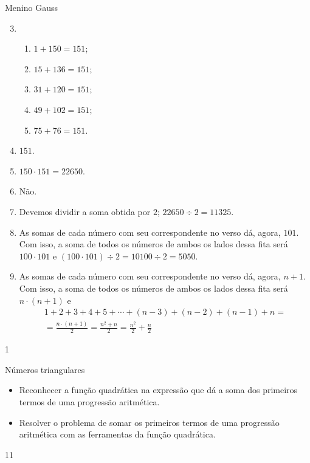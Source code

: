 \begin{answer}{Menino Gauss}
{
\begin{enumerate}\setcounter{enumi}{2}
\item {} 
\begin{enumerate}[label=\Roman*)]
\item \(1+150=151\);

\item \(15+136=151\);

\item \(31+120=151\);

\item \(49+102=151\);

\item \(75+76=151\).
\end{enumerate}

\item {} 
\(151\).

\item {} 
\(150 \cdot 151=22650\).

\item {} 
Não.

\item {} 
Devemos dividir a soma obtida por \(2\); \(22650 \div 2=11325\).

\item {} 
As somas de cada número com seu correspondente no verso dá, agora, \(101\). Com isso, a soma de todos os números de ambos os lados dessa fita será \(100 \cdot 101\) e \((100 \cdot 101) \div 2 = 10100 \div 2 = 5050\).

\item {} 
As somas de cada número com seu correspondente no verso dá, agora, \(n+1\). Com isso, a soma de todos os números de ambos os lados dessa fita será \(n \cdot (n+1)\) e
\begin{gather*}
1+2+3+4+5+ \cdots +(n-3)+(n-2)+(n-1)+n=\\=\frac{n \cdot (n+1)}{2}
=\frac{n^2 + n}{2}=\frac{n^2}{2} + \frac{n}{2}
\end{gather*}
\end{enumerate}
}{1}
\end{answer}
\clearmargin
\begin{objectives}{Números triangulares}
{
\begin{itemize}
\item Reconhecer a função quadrática na expressão que dá a soma dos primeiros termos de uma progressão aritmética.
\item Resolver o problema de somar os primeiros termos de uma progressão aritmética com as ferramentas da função quadrática.
\end{itemize}
}{1}{1}
\end{objectives}
